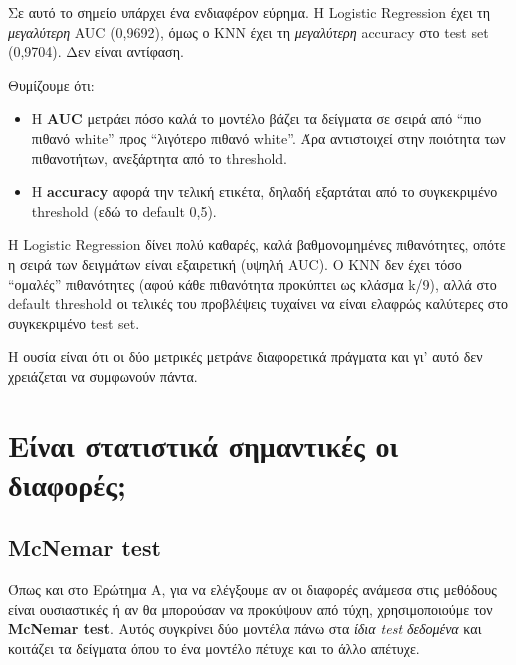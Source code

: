 \documentclass[11pt,a4paper]{article}
\begin{document}
Σε αυτό το σημείο υπάρχει ένα ενδιαφέρον εύρημα. Η Logistic Regression
έχει τη \emph{μεγαλύτερη} AUC (0,9692), όμως ο KNN έχει τη
\emph{μεγαλύτερη} accuracy στο test set (0,9704). Δεν είναι αντίφαση.

Θυμίζουμε ότι:
\begin{itemize}
    \item Η \textbf{AUC} μετράει πόσο καλά το μοντέλο βάζει τα δείγματα
    σε σειρά από ``πιο πιθανό white'' προς ``λιγότερο πιθανό white''.
    Άρα αντιστοιχεί στην ποιότητα των πιθανοτήτων, ανεξάρτητα από το
    threshold.
    \item Η \textbf{accuracy} αφορά την τελική ετικέτα, δηλαδή εξαρτάται
    από το συγκεκριμένο threshold (εδώ το default 0,5).
\end{itemize}

Η Logistic Regression δίνει πολύ καθαρές, καλά βαθμονομημένες
πιθανότητες, οπότε η σειρά των δειγμάτων είναι εξαιρετική (υψηλή AUC).
Ο KNN δεν έχει τόσο ``ομαλές'' πιθανότητες (αφού κάθε πιθανότητα προκύπτει
ως κλάσμα k/9), αλλά στο default threshold οι τελικές του προβλέψεις
τυχαίνει να είναι ελαφρώς καλύτερες στο συγκεκριμένο test set.

Η ουσία είναι ότι οι δύο μετρικές μετράνε διαφορετικά πράγματα και γι'
αυτό δεν χρειάζεται να συμφωνούν πάντα.

\section{Είναι στατιστικά σημαντικές οι διαφορές;}

\subsection{McNemar test}

Όπως και στο Ερώτημα Α, για να ελέγξουμε αν οι διαφορές ανάμεσα στις
μεθόδους είναι ουσιαστικές ή αν θα μπορούσαν να προκύψουν από τύχη,
χρησιμοποιούμε τον \textbf{McNemar test}. Αυτός συγκρίνει δύο μοντέλα
πάνω στα \emph{ίδια test δεδομένα} και κοιτάζει τα δείγματα όπου το ένα
μοντέλο πέτυχε και το άλλο απέτυχε.
\end{document}
